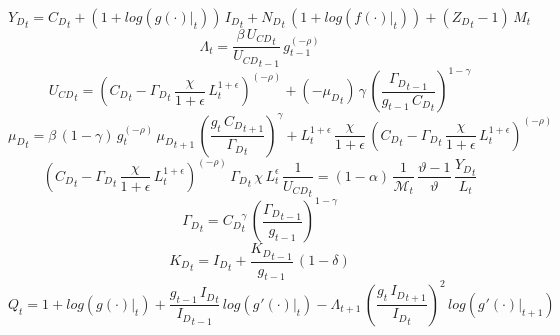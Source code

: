 \documentclass[10pt,a4paper]{article}
\begin{document}
\begin{dmath}
{Y_D}_{t}={C_D}_{t}+\left(1+log\left({\left.       g\left( \cdot \right)            \right|}_{t}\right)\right)\, {I_D}_{t}+{N_D}_{t}\, \left(1+log\left({\left.       f\left( \cdot \right)            \right|}_{t}\right)\right)+\left({Z_D}_{t}-1\right)\, {M}_{t}
\end{dmath}
\begin{dmath}
{\Lambda}_{t}=\frac{\beta\, {U_{CD}}_{t}}{{U_{CD}}_{t-1}}\, {g}_{t-1}^{\left(-\rho\right)}
\end{dmath}
\begin{dmath}
{U_{CD}}_{t}=\left({C_D}_{t}-{\Gamma_D}_{t}\, \frac{\chi}{1+\epsilon}\, {L}_{t}^{1+\epsilon}\right)^{\left(-\rho\right)}+\left(-{{\mu}_{D}}_{t}\right)\, \gamma\, \left(\frac{{\Gamma_D}_{t-1}}{{g}_{t-1}\, {C_D}_{t}}\right)^{1-\gamma}
\end{dmath}
\begin{dmath}
{{\mu}_{D}}_{t}=\beta\, \left(1-\gamma\right)\, {g}_{t}^{\left(-\rho\right)}\, {{\mu}_{D}}_{t+1}\, \left(\frac{{g}_{t}\, {C_D}_{t+1}}{{\Gamma_D}_{t}}\right)^{\gamma}+{L}_{t}^{1+\epsilon}\, \frac{\chi}{1+\epsilon}\, \left({C_D}_{t}-{\Gamma_D}_{t}\, \frac{\chi}{1+\epsilon}\, {L}_{t}^{1+\epsilon}\right)^{\left(-\rho\right)}
\end{dmath}
\begin{dmath}
\left({C_D}_{t}-{\Gamma_D}_{t}\, \frac{\chi}{1+\epsilon}\, {L}_{t}^{1+\epsilon}\right)^{\left(-\rho\right)}\, {\Gamma_D}_{t}\, \chi\, {L}_{t}^{\epsilon}\, \frac{1}{{U_{CD}}_{t}}=\left(1-\alpha\right)\, \frac{1}{\mathcal{M}_{t}}\, \frac{\vartheta-1}{\vartheta}\, \frac{{Y_D}_{t}}{{L}_{t}}
\end{dmath}
\begin{dmath}
{\Gamma_D}_{t}={C_D}_{t}^{\gamma}\, \left(\frac{{\Gamma_D}_{t-1}}{{g}_{t-1}}\right)^{1-\gamma}
\end{dmath}
\begin{dmath}
{K_D}_{t}={I_D}_{t}+\frac{{K_D}_{t-1}}{{g}_{t-1}}\, \left(1-\delta\right)
\end{dmath}
\begin{dmath}
{Q}_{t}=1+log\left({\left.       g\left( \cdot \right)            \right|}_{t}\right)+\frac{{g}_{t-1}\, {I_D}_{t}}{{I_D}_{t-1}}\, log\left({\left.       g^‎{\prime}\left( \cdot \right)   \right|}_{t}\right)-{\Lambda}_{t+1}\, \left(\frac{{g}_{t}\, {I_D}_{t+1}}{{I_D}_{t}}\right)^{2}\, log\left({\left.       g^‎{\prime}\left( \cdot \right)   \right|}_{t+1}\right)
\end{dmath}
\end{document}
